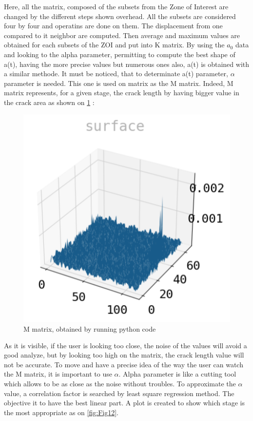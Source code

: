 Here, all the matrix, composed of the subsets from the Zone of Interest are changed by the different steps shown overhead. All the subsets are considered four by four and operatins are done on them. The displacement from one compared to it neighbor are computed. Then average and maximum values are obtained for each subsets of the ZOI and put into K matrix. By using the $a_{0}$ data and looking to the alpha parameter, permitting to compute the best shape of a(t), having the more precise values but numerous ones also, a(t) is obtained with a similar methode. It must be noticed, that to determinate a(t) parameter, $\alpha$ parameter is needed. This one is used on matrix as the M matrix. Indeed, M matrix represents, for a given stage, the crack length by having bigger value in the crack area as shown on \ref{fig:Fig11} : 

\begin{figure}[h]
	\centering
	\includegraphics[scale=0.5]{Figures/M_matrix}
	\decoRule
	\caption[M matrix]{M matrix, obtained by running python code}
	\label{fig:Fig11}
\end{figure}

As it is visible, if the user is looking too close, the noise of the values will avoid a good analyze, but by looking too high on the matrix, the crack length value will not be accurate. To move and have a precise idea of the way the user can watch the M matrix, it is important to use $\alpha$. Alpha parameter is like a cutting tool which allows to be as close as the noise without troubles.
To approximate the $\alpha$ value, a correlation factor is searched by least square regression method. The objective it to have the best linear part. A plot is created to show which stage is the most appropriate as on \ref{fig:Fig12}.

